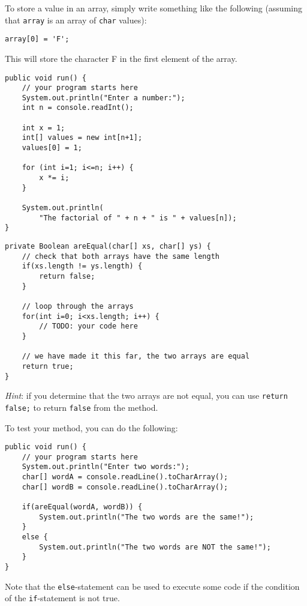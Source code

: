 To store a value in an array, simply write something like the following (assuming that \texttt{array} is an array of \texttt{char} values):
\begin{verbatim}
array[0] = 'F';
\end{verbatim}
This will store the character F in the first element of the array.

\taskLine 

\begin{verbatim}
public void run() {
    // your program starts here
    System.out.println("Enter a number:");
    int n = console.readInt();

    int x = 1;
    int[] values = new int[n+1];
    values[0] = 1;
    
    for (int i=1; i<=n; i++) {
        x *= i; 
    }

    System.out.println(
        "The factorial of " + n + " is " + values[n]);
}
\end{verbatim}

\taskLine 

\begin{verbatim}
private Boolean areEqual(char[] xs, char[] ys) {
    // check that both arrays have the same length
    if(xs.length != ys.length) {
        return false;
    }

    // loop through the arrays
    for(int i=0; i<xs.length; i++) {
        // TODO: your code here
    }

    // we have made it this far, the two arrays are equal
    return true;
}
\end{verbatim}
\emph{Hint}: if you determine that the two arrays are not equal, you can use \texttt{return false;} to return \texttt{false} from the method.

To test your method, you can do the following:
\begin{verbatim}
public void run() {
    // your program starts here
    System.out.println("Enter two words:");
    char[] wordA = console.readLine().toCharArray();
    char[] wordB = console.readLine().toCharArray();

    if(areEqual(wordA, wordB)) {
        System.out.println("The two words are the same!");
    }
    else {
        System.out.println("The two words are NOT the same!");
    }
}
\end{verbatim}
Note that the \texttt{else}-statement can be used to execute some code if the condition of the \texttt{if}-statement is not true.
\taskLine 
	
